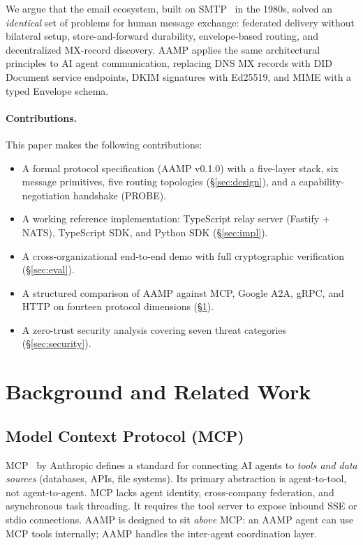 \documentclass[11pt,a4paper]{article}
\begin{document}
We argue that the email ecosystem, built on SMTP~\cite{rfc5321} in the 1980s, solved
an \emph{identical} set of problems for human message exchange: federated delivery
without bilateral setup, store-and-forward durability, envelope-based routing, and
decentralized MX-record discovery. AAMP applies the same architectural principles to
AI agent communication, replacing DNS MX records with DID Document service endpoints,
DKIM signatures with Ed25519, and MIME with a typed Envelope schema.

\paragraph{Contributions.} This paper makes the following contributions:
\begin{itemize}[leftmargin=*]
  \item A formal protocol specification (AAMP v0.1.0) with a five-layer stack, six
    message primitives, five routing topologies (\S\ref{sec:design}), and a
    capability-negotiation handshake (PROBE).
  \item A working reference implementation: TypeScript relay server (Fastify + NATS),
    TypeScript SDK, and Python SDK (\S\ref{sec:impl}).
  \item A cross-organizational end-to-end demo with full cryptographic verification
    (\S\ref{sec:eval}).
  \item A structured comparison of AAMP against MCP, Google A2A, gRPC, and HTTP on
    fourteen protocol dimensions (\S\ref{sec:related}).
  \item A zero-trust security analysis covering seven threat categories (\S\ref{sec:security}).
\end{itemize}

\section{Background and Related Work}
\label{sec:related}

\subsection{Model Context Protocol (MCP)}

MCP~\cite{anthropic2024mcp} by Anthropic defines a standard for connecting AI agents
to \emph{tools and data sources} (databases, APIs, file systems). Its primary
abstraction is agent-to-tool, not agent-to-agent. MCP lacks agent identity, cross-company
federation, and asynchronous task threading. It requires the tool server to expose
inbound SSE or stdio connections. AAMP is designed to sit \emph{above} MCP: an AAMP
agent can use MCP tools internally; AAMP handles the inter-agent coordination layer.
\end{document}
